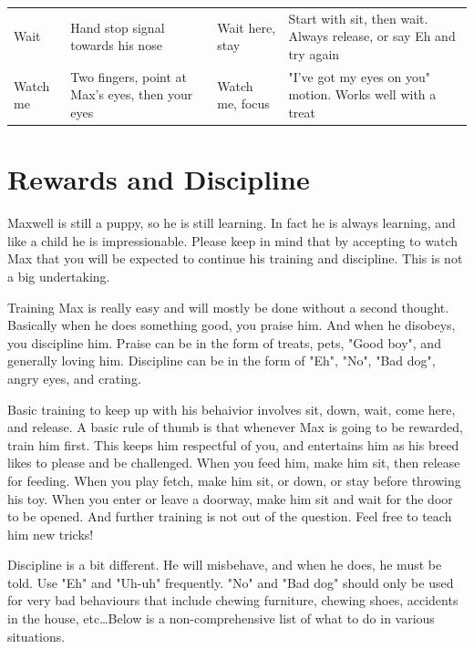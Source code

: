 \documentclass[pdftex,12pt]{article}
\begin{document}
\begin{table}[H]
\begin{adjustwidth}{-4.5cm}{-4.5cm}
\begin{center}
\begin{tabular}{lp{}p{}p{}}
        Wait        & Hand stop signal towards his nose                & Wait here, stay                                       & Start with sit, then wait. Always release, or say Eh and try again \\
        Watch me    & Two fingers, point at Max's eyes, then your eyes & Watch me, focus                                       & "I've got my eyes on you" motion. Works well with a treat         
    \end{tabular}
\end{center}
\end{adjustwidth}
\end{table}

\newpage
\section{Rewards and Discipline}

Maxwell is still a puppy, so he is still learning. In fact he is always
learning, and like a child he is impressionable. Please keep in mind that by
accepting to watch Max that you will be expected to continue his training and
discipline.  This is not a big undertaking. 

\bigskip

Training Max is really easy and will mostly be done without a second thought.
Basically when he does something good, you praise him. And when he disobeys, you
discipline him. Praise can be in the form of treats, pets, "Good boy", and
generally loving him. Discipline can be in the form of "Eh", "No", "Bad dog",
angry eyes, and crating. 

\bigskip

Basic training to keep up with his behaivior involves sit, down, wait, come
here, and release. A basic rule of thumb is that whenever Max is going to be
rewarded, train him first. This keeps him respectful of you, and entertains him
as his breed likes to please and be challenged. When you feed him, make him sit,
then release for feeding. When you play fetch, make him sit, or down, or stay
before throwing his toy. When you enter or leave a doorway, make him sit and
wait for the door to be opened. And further training is not out of the question.
Feel free to teach him new tricks!

\bigskip

Discipline is a bit different. He will misbehave, and when he does, he must be
told. Use "Eh" and "Uh-uh" frequently. "No" and "Bad dog" should only be used
for very bad behaviours that include chewing furniture, chewing shoes, accidents
in the house, etc\ldots Below is a non-comprehensive list of what to do in
various situations.
\end{document}
